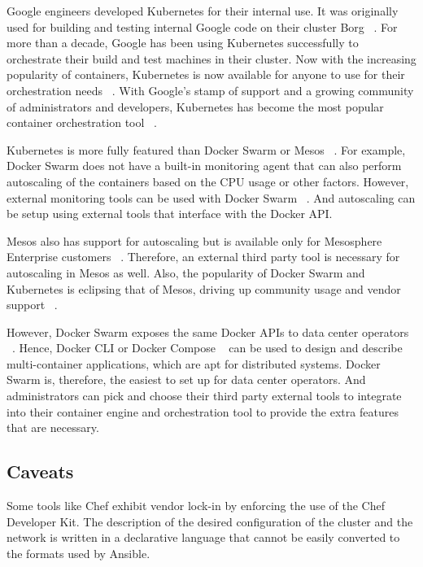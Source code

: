 \documentclass[10pt,twocolumn]{article}
\begin{document}
Google engineers developed Kubernetes for their internal use.
It was originally used for building and testing internal Google code on their cluster Borg ~\cite{kubernetes, borg}.
For more than a decade, Google has been using Kubernetes successfully to orchestrate their build and test machines in their cluster.
Now with the increasing popularity of containers, Kubernetes is now available for anyone to use for their orchestration needs ~\cite{kubernetes_github}.
With Google's stamp of support and a growing community of administrators and developers, Kubernetes has become the most popular container orchestration tool ~\cite{openhub}.

Kubernetes is more fully featured than Docker Swarm or Mesos ~\cite{kubernetes}.
For example, Docker Swarm does not have a built-in monitoring agent that can also perform autoscaling of the containers based on the CPU usage or other factors.
However, external monitoring tools can be used with Docker Swarm ~\cite{docker_swarm}.
And autoscaling can be setup using external tools that interface with the Docker API.

Mesos also has support for autoscaling but is available only for Mesosphere Enterprise customers ~\cite{mesosphere}.
Therefore, an external third party tool is necessary for autoscaling in Mesos as well.
Also, the popularity of Docker Swarm and Kubernetes is eclipsing that of Mesos, driving up community usage and vendor support ~\cite{openhub}.

However, Docker Swarm exposes the same Docker APIs to data center operators ~\cite{docker_swarm}.
Hence, Docker CLI or Docker Compose ~\cite{docker_compose} can be used to design and describe multi-container applications, which are apt for distributed systems.
Docker Swarm is, therefore, the easiest to set up for data center operators.
And administrators can pick and choose their third party external tools to integrate into their container engine and orchestration tool to provide the extra features that are necessary.

\subsection{Caveats}

Some tools like Chef exhibit vendor lock-in by enforcing the use of the Chef Developer Kit.
The description of the desired configuration of the cluster and the network is written in a declarative language that cannot be easily converted to the formats used by Ansible.
\end{document}

